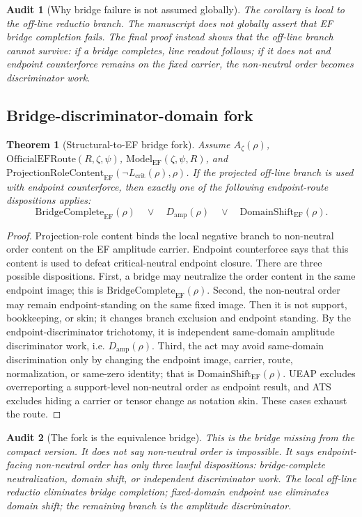 \documentclass[11pt]{article}
\newtheorem{theorem}{Theorem}[section]
\newtheorem{audit}{Audit}[section]
\newcommand{\Az}{A_{\zeta}}
\newcommand{\Lcrit}{L_{\mathrm{crit}}}
\newcommand{\ModelEF}{\mathrm{Model}_{\mathrm{EF}}}
\newcommand{\OfficialEFRoute}{\mathrm{OfficialEFRoute}}
\newcommand{\Damp}{D_{\mathrm{amp}}}
\newcommand{\ProjRoleEF}{\mathrm{ProjectionRoleContent}_{\mathrm{EF}}}
\newcommand{\BridgeCompleteEF}{\mathrm{BridgeComplete}_{\mathrm{EF}}}
\newcommand{\DomainShiftEF}{\mathrm{DomainShift}_{\mathrm{EF}}}
\begin{document}
\begin{audit}[Why bridge failure is not assumed globally]
The corollary is local to the off-line reductio branch.  The manuscript does not globally assert that EF bridge completion fails.  The final proof instead shows that the off-line branch cannot survive: if a bridge completes, line readout follows; if it does not and endpoint counterforce remains on the fixed carrier, the non-neutral order becomes discriminator work.
\end{audit}

\subsection{Bridge-discriminator-domain fork}

\begin{theorem}[Structural-to-EF bridge fork]
Assume \(\Az(\rho)\), \(\OfficialEFRoute(R,\zeta,\psi)\), \(\ModelEF(\zeta,\psi,R)\), and \(\ProjRoleEF(\neg\Lcrit(\rho),\rho)\).  If the projected off-line branch is used with endpoint counterforce, then exactly one of the following endpoint-route dispositions applies:
\[
\BridgeCompleteEF(\rho)\quad\vee\quad \Damp(\rho)\quad\vee\quad \DomainShiftEF(\rho).
\]
\end{theorem}

\begin{proof}
Projection-role content binds the local negative branch to non-neutral order content on the EF amplitude carrier.  Endpoint counterforce says that this content is used to defeat critical-neutral endpoint closure.  There are three possible dispositions.  First, a bridge may neutralize the order content in the same endpoint image; this is \(\BridgeCompleteEF(\rho)\).  Second, the non-neutral order may remain endpoint-standing on the same fixed image.  Then it is not support, bookkeeping, or skin; it changes branch exclusion and endpoint standing.  By the endpoint-discriminator trichotomy, it is independent same-domain amplitude discriminator work, i.e. \(\Damp(\rho)\).  Third, the act may avoid same-domain discrimination only by changing the endpoint image, carrier, route, normalization, or same-zero identity; that is \(\DomainShiftEF(\rho)\).  UEAP excludes overreporting a support-level non-neutral order as endpoint result, and ATS excludes hiding a carrier or tensor change as notation skin.  These cases exhaust the route.
\end{proof}

\begin{audit}[The fork is the equivalence bridge]
This is the bridge missing from the compact version.  It does not say non-neutral order is impossible.  It says endpoint-facing non-neutral order has only three lawful dispositions: bridge-complete neutralization, domain shift, or independent discriminator work.  The local off-line reductio eliminates bridge completion; fixed-domain endpoint use eliminates domain shift; the remaining branch is the amplitude discriminator.
\end{audit}
\end{document}
